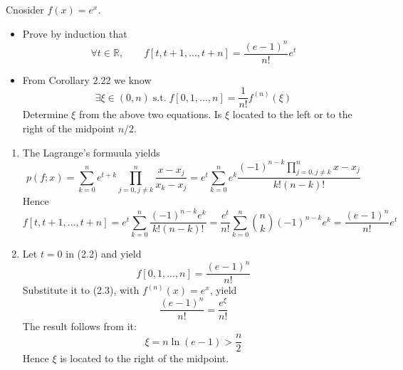 \documentclass[11pt]{elegantbook}
\begin{document}
\vspace{1.5em}

\begin{problem}
  Cnosider $f(x)=e^x$.
  \begin{itemize}
    \item Prove by induction that
    \begin{equation}
      \forall t\in \mathbb{R}, \qquad f[t,t+1,...,t+n]=\frac{(e-1)^n}{n!}e^t
    \end{equation}
    \item From Corollary 2.22 we know
    \begin{equation}
      \exists \xi\in(0,n) \; \text{s.t.} \; f[0,1,...,n]=\frac{1}{n!}f^{(n)}(\xi)
    \end{equation}
    Determine $\xi$ from the above two equations. Is $\xi$ located to the left or to the right of the midpoint $n/2$.
  \end{itemize}
\end{problem}

\begin{solution}
  \begin{enumerate}
    \item The Lagrange's formuula yields
    \begin{equation*}
      p(f;x) = \sum_{k=0}^n e^{t+k} \prod_{j=0,j\neq k}^n \frac{x-x_j}{x_k-x_j} = e^t\sum_{k=0}^n e^{k} \frac{(-1)^{n-k}\prod_{j=0,j\neq k}^nx-x_j}{k!(n-k)!}
    \end{equation*}
    Hence
    \begin{equation*}
      f[t,t+1,...,t+n] = e^t\sum_{k=0}^n \frac{(-1)^{n-k}e^k}{k!(n-k)!} = \frac{e^t}{n!}\sum_{k=0}^n \binom{n}{k}(-1)^{n-k}e^k = \frac{(e-1)^n}{n!}e^t
    \end{equation*}

    \item Let $t=0$ in (2.2) and yield
    \begin{equation*}
      f[0,1,...,n]=\frac{(e-1)^n}{n!}
    \end{equation*}
    Substitute it to (2.3), with $f^{(n)}(x)=e^x$, yield
    \begin{equation*}
      \frac{(e-1)^n}{n!} = \frac{e^\xi}{n!}
    \end{equation*}
    The result follows from it:
    \begin{equation*}
      \xi=n\ln(e-1)>\frac{n}{2}
    \end{equation*}
    Hence $\xi$ is located to the right of the midpoint.
  \end{enumerate}
\end{solution}
\end{document}
